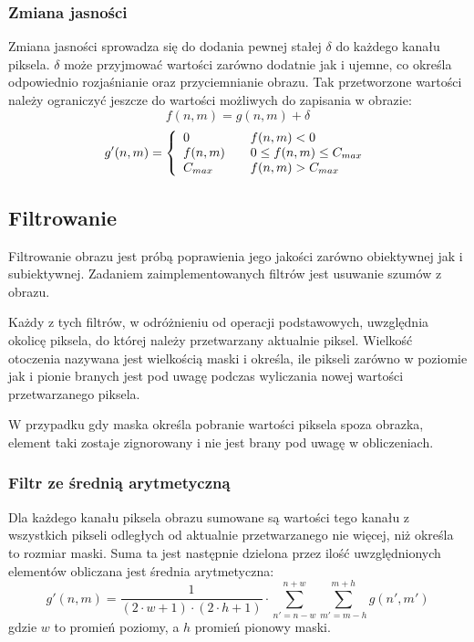 \documentclass{classrep}
\begin{document}
\subsubsection{Zmiana jasności}
\label{filter.brightness}
Zmiana jasności sprowadza się do dodania pewnej stałej $\delta$ do każdego kanału piksela. $\delta$ może przyjmować wartości zarówno dodatnie jak i ujemne, co określa odpowiednio rozjaśnianie oraz przyciemnianie obrazu. Tak przetworzone wartości należy ograniczyć jeszcze do wartości możliwych do zapisania w obrazie:
\begin{equation}
\label{eq.brightness}
 f(n, m) = g(n, m) + \delta
\end{equation}
\begin{equation}
 g'(n, m) = \left\{
  \begin{array}{l l}
    0 & \quad f(n, m) < 0 \\
    f(n, m) & \quad 0 \leq f(n, m) \leq C_{max} \\
    C_{max} & \quad f(n, m) > C_{max} \\
  \end{array}
\right.
\end{equation}

\subsection{Filtrowanie}
Filtrowanie obrazu jest próbą poprawienia jego jakości \ppauza zarówno obiektywnej jak i subiektywnej. Zadaniem zaimplementowanych filtrów jest usuwanie szumów z obrazu.

Każdy z tych filtrów, w odróżnieniu od operacji podstawowych, uwzględnia okolicę piksela, do której należy przetwarzany aktualnie piksel. Wielkość otoczenia nazywana jest wielkością maski i określa, ile pikseli zarówno w poziomie jak i pionie branych jest pod uwagę podczas wyliczania nowej wartości przetwarzanego piksela.

W przypadku gdy maska określa pobranie wartości piksela spoza obrazka, element taki zostaje zignorowany i nie jest brany pod uwagę w obliczeniach.

\subsubsection{Filtr ze średnią arytmetyczną}
\label{filter.average}
Dla każdego kanału piksela obrazu sumowane są wartości tego kanału z wszystkich pikseli odległych od aktualnie przetwarzanego nie więcej, niż określa to rozmiar maski. Suma ta jest następnie dzielona przez ilość uwzględnionych elementów \ppauza obliczana jest średnia arytmetyczna:
\begin{equation}
 g'(n, m) = \frac{1}{(2 \cdot w + 1) \cdot (2 \cdot h + 1)} \cdot \displaystyle \sum \limits_{n' = n - w}^{n + w} \displaystyle \sum \limits_{m' = m - h}^{m + h} g(n', m')
\end{equation}
gdzie $w$ to promień poziomy, a $h$ promień pionowy maski.
\end{document}
